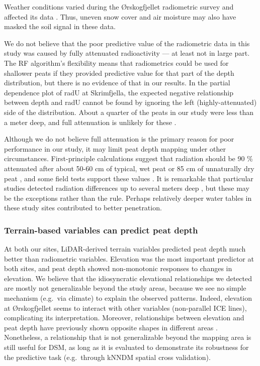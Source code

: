 \documentclass[soil, manuscript]{copernicus}
\begin{document}
Weather conditions varied during the Ørskogfjellet radiometric survey and affected its data \citep{ofstadHelicopterborneMagneticRadiometric2015}.
Thus, uneven snow cover and air moisture may also have masked the soil signal in these data.

We do not believe that the poor predictive value of the radiometric data in this study was caused by fully attenuated radioactivity --- at least not in large part.
The RF algorithm's flexibility means that radiometrics could be used for shallower peats if they provided predictive value for that part of the depth distribution, but there is no evidence of that in our results.
In the partial dependence plot of radU at Skrimfjella, the expected negative relationship between depth and radU cannot be found by ignoring the left (highly-attenuated) side of the distribution.
About a quarter of the peats in our study were less than a meter deep, and full attenuation is unlikely for these \citep{beamishGammaRayAttenuation2013}.

Although we do not believe full attenuation is the primary reason for poor performance in our study, it may limit peat depth mapping under other circumstances.
First-principle calculations suggest that radiation should be 90 \% attenuated after about 50-60 cm of typical, wet peat or 85 cm of unnaturally dry peat \citep{beamishGammaRayAttenuation2013, beamishDetailedMappingPeat2024}, and some field tests support these values \citep{billenEignungGammaspektrometrieKartieren2015}.
It is remarkable that particular studies detected radiation differences up to several meters deep \citep{gatisMappingUplandPeat2019, kogantiMappingPeatDepth2023}, but these may be the exceptions rather than the rule.
Perhaps relatively deeper water tables in these study sites \citep[blanket bog, drained fen,][]{pricePeatlandRestorationHydrology2016} contributed to better penetration.

\subsubsection{Terrain-based variables can predict peat depth}

At both our sites, LiDAR-derived terrain variables predicted peat depth much better than radiometric variables.
Elevation was the most important predictor at both sites, and peat depth showed non-monotonic responses to changes in elevation.
We believe that the idiosyncratic elevational relationships we detected are mostly not generalizable beyond the study areas, because we see no simple mechanism (e.g.~via climate) to explain the observed patterns.
Indeed, elevation at Ørskogfjellet seems to interact with other variables (non-parallel ICE lines), complicating its interpretation.
Moreover, relationships between elevation and peat depth have previously shown opposite shapes in different areas \citep{finlaysonEstimatingOrganicSurface2021}.
Nonetheless, a relationship that is not generalizable beyond the mapping area is still useful for DSM, as long as it is evaluated to demonstrate its robustness for the predictive task (e.g.~through kNNDM spatial cross validation).
\end{document}

